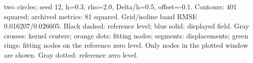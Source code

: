 two circles; seed 12, h=0.3, rho=2.0, Delta/h=0.5, offset=-0.1. Contours: 401 squared; archived metrics: 81 squared. Grid/isoline band RMSE 0.016207/0.026605. Black dashed: reference level; blue solid: displayed field. Gray crosses: kernel centers; orange dots: fitting nodes; segments: displacements; green rings: fitting nodes on the reference zero level. Only nodes in the plotted window are shown. Gray dotted: reference zero level.